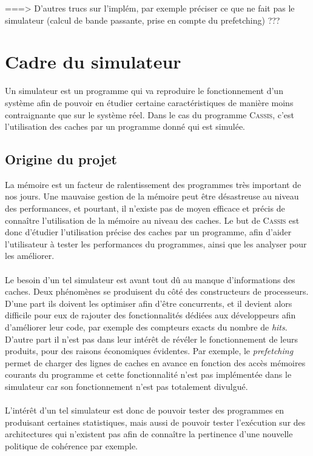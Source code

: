 

===> D'autres trucs sur l'implém, par exemple préciser ce que ne fait pas le simulateur (calcul de bande passante, prise en compte du prefetching) ???


\section{Cadre du simulateur}

Un simulateur est un programme qui va reproduire le fonctionnement d'un système afin de pouvoir en étudier certaine caractéristiques de manière moins contraignante que sur le système réel. Dans le cas du programme \textsc{Cassis}, c'est l'utilisation des caches par un programme donné qui est simulée.

\subsection{Origine du projet}

La mémoire est un facteur de ralentissement des programmes très important de nos jours. Une mauvaise gestion de la mémoire peut être désastreuse au niveau des performances, et pourtant, il n'existe pas de moyen efficace et précis de connaître l'utilisation de la mémoire au niveau des caches. Le but de \textsc{Cassis} est donc d'étudier l'utilisation précise des caches par un programme, afin d'aider l'utilisateur à tester les performances du programmes, ainsi que les analyser pour les améliorer.

\paragraph{}
Le besoin d'un tel simulateur est avant tout dû au manque d'informations des caches. Deux phénomènes se produisent du côté des constructeurs de processeurs. D'une part ils doivent les optimiser afin d'être concurrents, et il devient alors difficile pour eux de rajouter des fonctionnalités dédiées aux développeurs afin d'améliorer leur code, par exemple des compteurs exacts du nombre de \emph{hits}. D'autre part il n'est pas dans leur intérêt de révéler le fonctionnement de leurs produits, pour des raisons économiques évidentes. Par exemple, le \emph{prefetching} permet de charger des lignes de caches en avance en fonction des accès mémoires courants du programme et cette fonctionnalité n'est pas implémentée dans le simulateur car son fonctionnement n'est pas totalement divulgué.

\paragraph{}
L'intérêt d'un tel simulateur est donc de pouvoir tester des programmes en produisant certaines statistiques, mais aussi de pouvoir tester l'exécution sur des architectures qui n'existent pas afin de connaître la pertinence d'une nouvelle politique de cohérence par exemple.

